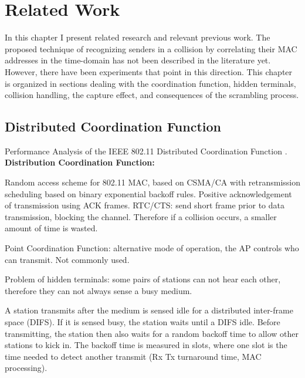 
\chapter{Related Work}\label{ch:relatedwork}
\glsresetall %

In this chapter I present related research and relevant previous work. The proposed technique of recognizing senders in a collision by correlating their MAC addresses in the time-domain has not been described in the literature yet. However, there have been experiments that point in this direction. This chapter is organized in sections dealing with the coordination function, hidden terminals, collision handling, the capture effect, and consequences of the scrambling process.



\section{Distributed Coordination Function}

Performance Analysis of the IEEE 802.11 Distributed Coordination Function \cite{bianchi2000}.\\

\textbf{Distribution Coordination Function:}

Random access scheme for 802.11 MAC, based on CSMA/CA with retransmission scheduling based on binary exponential backoff rules. Positive acknowledgement of transmission using ACK frames. RTC/CTS: send short frame prior to data transmission, blocking the channel. Therefore if a collision occurs, a smaller amount of time is wasted.

Point Coordination Function: alternative mode of operation, the AP controls who can transmit. Not commonly used.

Problem of hidden terminals: some pairs of stations can not hear each other, therefore they can not always sense a busy medium.

A station transmits after the medium is sensed idle for a distributed inter-frame space (DIFS). If it is sensed busy, the station waits until a DIFS idle. Before transmitting, the station then also waits for a random backoff time to allow other stations to kick in. The backoff time is measured in slots, where one slot is the time needed to detect another transmit (Rx Tx turnaround time, MAC processing).

